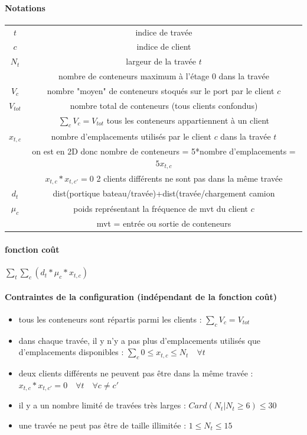 \documentclass{article}
\begin{document}
\paragraph{Notations}
\begin{table}[h!]
\centering
 \begin{tabular}{|c|c|}
\hline
$t$ & indice de travée \\
$c$ & indice de client \\
$N_t$ & largeur de la travée $t$ \\
& nombre de conteneurs maximum à l'étage 0 dans la travée \\
$V_c$ & nombre "moyen" de conteneurs stoqués sur le port par le client $c$ \\
$V_{tot}$ & nombre total de conteneurs (tous clients confondus) \\
& $\sum_{c} V_c = V_{tot}$ tous les conteneurs appartiennent à un client \\
$x_{t,c}$ & nombre d'emplacements utilisés par le client $c$ dans la travée $t$ \\
 & on est en 2D donc nombre de conteneurs = 5*nombre d'emplacements = $5x_{t,c}$ \\
 & $x_{t,c}*x_{t,c'}=0$ 2 clients différents ne sont pas dans la même travée \\
$d_t$ & dist(portique bateau/travée)+dist(travée/chargement camion \\
$\mu_c$ & poids représentant la fréquence de mvt du client $c$ \\
 & mvt = entrée ou sortie de conteneurs \\
\hline
\end{tabular}
\end{table}

\paragraph{fonction coût}
$\sum_t \sum_c (d_t * \mu_c * x_{t,c})$


\paragraph{Contraintes de la configuration (indépendant de la fonction coût)}
\begin{itemize}
\item tous les conteneurs sont répartis parmi les clients :
$\sum_{c} V_c = V_{tot}$ 
\item dans chaque travée, il y n'y a pas plus d'emplacements utilisés que d'emplacements disponibles :
$\sum_c 0\le x_{t,c} \le N_t \quad \forall t$ 
\item deux clients différents ne peuvent pas être dans la même travée :
$x_{t,c}*x_{t,c'}=0 \quad \forall t \quad \forall c \neq c' $
\item il y a un nombre limité de travées très larges :
$Card(N_t | N_t\ge 6) \le 30$
\item une travée ne peut pas être de taille illimitée :
$1 \le N_t \le 15$
\end{itemize}
\end{document}
